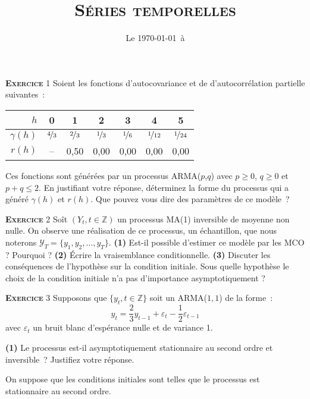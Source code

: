 \documentclass[10pt,a4paper,notitlepage,twocolumn]{article}
\newcommand{\exercice}[1]{\textsc{\textbf{Exercice}} #1}
\newcommand{\question}[1]{\textbf{(#1)}}
\begin{document}
\title{\textsc{Séries temporelles}}
\date{Le \today\ à \thistime}


\maketitle

\exercice{1} Soient les fonctions d'autocovariance et de d'autocorrélation
partielle suivantes :
\begin{table}[H]
  \centering
  \begin{tabular}{r|cccccc}
    \hline\hline
    $h$ & 0 & 1 & 2 & 3 & 4 & 5 \\\hline
    $\gamma(h)$ & $\nicefrac{4}{3}$ & $\nicefrac{2}{3}$ & $\nicefrac{1}{3}$ & $\nicefrac{1}{6}$ & $\nicefrac{1}{12}$ & $\nicefrac{1}{24}$\\
    $r (h)$ & -- & 0,50 & 0,00 & 0,00 & 0,00 & 0,00\\
    \hline\hline
  \end{tabular}
\end{table}
\noindent Ces  fonctions sont générées par  un processus ARMA($p$,$q$)
avec $p\geq 0$, $q\geq 0$ et $p+q \leq 2$. En
justifiant  votre réponse,  déterminez la forme  du  processus qui  a
généré $\gamma(h)$ et $r(h)$. Que pouvez vous dire des paramètres de ce
modèle~?

\bigskip
\bigskip

\exercice{2} Soît $(Y_t,t\in\mathbb Z)$ un processus MA(1) inversible de moyenne
non nulle. On observe une réalisation de ce processus, un échantillon, que nous
noterons $\mathcal Y_T = \{y_1,y_2,\dots,y_T\}$. \question{1} Est-il possible
d'estimer ce modèle par les MCO ? Pourquoi ? \question{2} Écrire la
vraisemblance conditionnelle. \question{3} Discuter les conséquences de
l'hypothèse sur la condition initiale. Sous quelle hypothèse le choix de la
condition initiale n'a pas d'importance asymptotiquement ?


\bigskip
\bigskip

\exercice{3} Supposons que $\{y_t,t\in\mathbb Z\}$ soit un ARMA($1,1$) de la forme :
\[
y_t = \frac{2}{3}y_{t-1} + \varepsilon_t - \frac{1}{2} \varepsilon_{t-1}
\]
avec $\varepsilon_t$ un bruit blanc d'espérance nulle et de variance 1.\newline

\question{1} Le processus est-il asymptotiquement stationnaire au second ordre
et inversible~? Justifiez votre réponse.\newline

On suppose  que les conditions initiales sont telles que le
processus est stationnaire au second ordre.\newline
\end{document}
